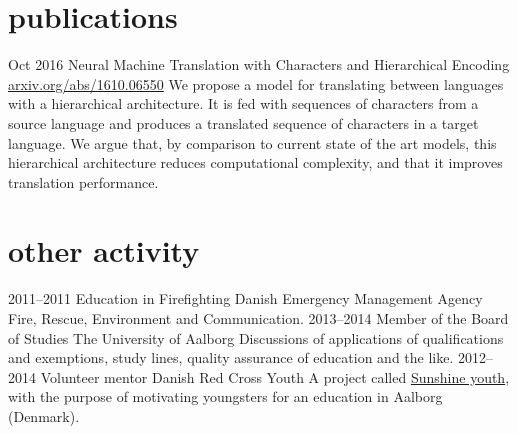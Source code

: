 \documentclass[]{friggeri-cv}
\begin{document}
\newpage

\section{publications}

\begin{entrylist}
  \entry
    {Oct 2016}
    {Neural Machine Translation with Characters and Hierarchical Encoding\\}
    {\href{https://arxiv.org/abs/1610.06550}{arxiv.org/abs/1610.06550}}
    {We propose a model for translating between languages with a hierarchical architecture. It is fed with sequences of 
    characters from a source language and produces a translated sequence of characters in a target language.
    We argue that, by comparison to current state of the art models, this hierarchical architecture reduces computational 
    complexity, and that it improves translation performance.}
\end{entrylist}

\section{other activity}

\begin{entrylist}
  \entry
    {2011--2011}
    {Education in Firefighting}
    {Danish Emergency Management Agency}
    {Fire, Rescue, Environment and Communication.}
  \entry
    {2013--2014}
    {Member of the Board of Studies}
    {The University of Aalborg}
    {Discussions of applications of qualifications and exemptions, study lines, quality assurance of education and the like.}
  \entry
    {2012--2014}
    {Volunteer mentor}
    {Danish Red Cross Youth}
    {A project called \href{http://www.urk.dk/solskinsunge/}{Sunshine youth}, with the purpose of motivating youngsters for an education in Aalborg (Denmark).}
\end{entrylist}
\end{document}
